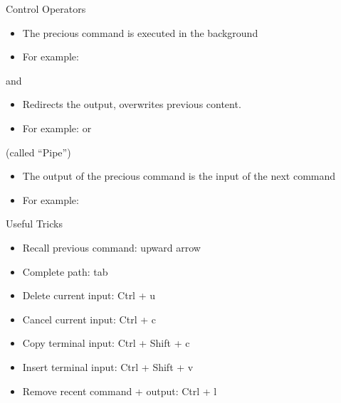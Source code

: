 \documentclass{setbeamer}
\begin{document}
\begin{frame}{Control Operators}
    \begin{itemize}
        \item The precious command is executed in the background
        \item For example: 
    \end{itemize}

    \vspace{0.3cm}

     and 
    \begin{itemize}
        \item Redirects the output,  overwrites previous content.
        \item For example:  or 
    \end{itemize}

    \vspace{0.3cm}

     (called ``Pipe'')
    \begin{itemize}
        \item The output of the precious command is the input of the next command
        \item For example: 
    \end{itemize}
\end{frame} 



\begin{frame}{Useful Tricks}
   
    \begin{itemize}
        \item Recall previous command: upward arrow
        \item Complete path: tab
        \item Delete current input: Ctrl + u
        \item Cancel current input: Ctrl + c
        \item Copy terminal input: Ctrl + Shift + c
        \item Insert terminal input: Ctrl + Shift + v
        \item Remove recent command + output: Ctrl + l
    \end{itemize}
    
\end{frame} 
\end{document}
